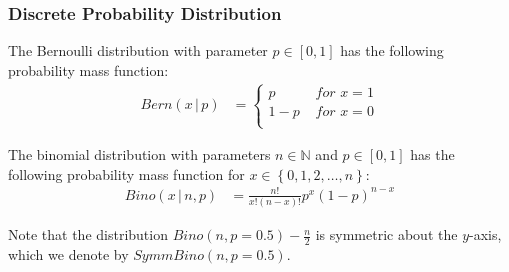 \subsubsection{Discrete Probability Distribution}
\label{subsubsec:DiscreteProbabilityDistribution}

\begin{definition}
    \label{def:BernoulliDistribution}
    The Bernoulli distribution with parameter $p \in \left[0,1\right] $ has the following probability mass function:
    \begin{equation}
        \begin{split}
            Bern\left(x \,|\,p \right)&=
            \begin{cases}
                p   & \textit{ for } x =1 \\
                1-p & \textit{ for } x =0 \\
            \end{cases}
        \end{split}
    \end{equation}
\end{definition}


\begin{definition}
    \label{def:BinomialDistribution}
    The binomial distribution with parameters $n \in \mathbb{N} $ and $p \in \left[0,1\right] $ has the following probability mass function for $x \in \left\{0,1,2, \ldots ,n\right\} $:
    \begin{equation}
        \begin{split}
            Bino\left( x \,|\,n,p \right)&=\frac{n!}{x!\left(n-x\right)! }p^x\left(1-p\right) ^{n-x}
        \end{split}
    \end{equation}
\end{definition}
Note that the distribution $Bino\left(n,p=0.5 \right)-\frac{n}{2}$ is symmetric about the $y$-axis, which we denote by $SymmBino\left(n,p=0.5 \right)$.


